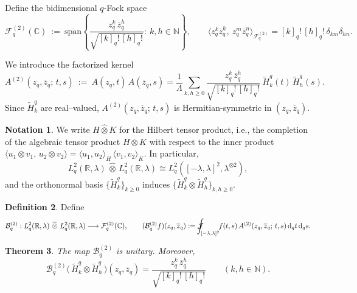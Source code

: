 \documentclass[10pt]{amsart}
\theoremstyle{plain}
\newtheorem{theorem}{Theorem}[section]
\theoremstyle{definition}
\newtheorem{definition}[theorem]{Definition}
\newtheorem{notation}[theorem]{Notation}
\renewcommand{\bar}[1]{\overline{#1}}
\newcommand{\Jint}{\mathcal{J}\mspace{-20mu}\int  }
\def\ge{\geqslant}
\begin{document}
\medskip


Define the {bidimensional $q$-Fock space}
\[
\mathcal{F}^{(2)}_q(\mathbb{C})\ :=\ \overline{\mathrm{span}}\left\{\frac{z_q^k\,\bar z_q^h}{\sqrt{[k]_q!\,[h]_q!}}:\ k,h\in\mathbb{N}\right\},
\qquad 
\big\langle z_q^k\bar z_q^h,\ z_q^m\bar z_q^n\big\rangle_{\mathcal{F}^{(2)}_q}
=[k]_q!\,[h]_q!\,\delta_{km}\delta_{hn}.
\]



We introduce the factorized kernel
\begin{equation}\label{eq:tensor-kernel}
A^{(2)}(z_q,\bar z_q;\,t,s)\ :=\ A(z_q,t)\,A(\bar z_q,s)
=\frac{1}{\Lambda}\sum_{k,h\ge0}\frac{z_q^k\,\bar z_q^h}{\sqrt{[k]_q!\,[h]_q!}}\ \widetilde H^q_k(t)\,\widetilde H^q_h(s).
\end{equation}
Since $\widetilde H^q_k$ are real–valued, $A^{(2)}(z_q,\bar z_q;\,t,s)$ is Hermitian-symmetric in $(z_q,\bar z_q)$.

\begin{notation}
We write $H\widehat\otimes K$ for the {Hilbert tensor product}, i.e., the completion of
the algebraic tensor product $H\otimes K$ with respect to the inner product
$\langle u_1\!\otimes\! v_1,\,u_2\!\otimes\! v_2\rangle=\langle u_1,u_2\rangle_H\,\langle v_1,v_2\rangle_K$.
In particular,
\[
L^2_q(\mathbb{R},\lambda)\,\widehat\otimes\,L^2_q(\mathbb{R},\lambda)
\cong L^2_q([-\lambda,\lambda]^2,\lambda^{\otimes 2}),
\]
and the orthonormal basis $\{\widetilde H^q_k\}_{k\ge0}$ induces
$\{\widetilde H^q_k\otimes \widetilde H^q_h\}_{k,h\ge0}$.
\end{notation}
\begin{definition}
Define
\[
\mathcal{B}_q^{(2)}:L^2_q(\mathbb{R},\lambda)\ \widehat\otimes\ L^2_q(\mathbb{R},\lambda)\longrightarrow \mathcal{F}^{(2)}_q(\mathbb{C}),
\qquad 
(\mathcal{B}_q^{(2)}f)(z_q,\bar z_q):=\Jint_{[-\lambda,\lambda]^2}\!\! f(t,s)\,A^{(2)}(z_q,\bar z_q;\,t,s)\,\mathrm{d}_qt\,\mathrm{d}_qs.
\]
\end{definition}

\begin{theorem}%
The map $\mathcal{B}_q^{(2)}$ is unitary. Moreover,
\[
\mathcal{B}_q^{(2)}\!\big(\,\widetilde H^q_k\otimes \widetilde H^q_h\,\big)(z_q,\bar z_q)
=\frac{z_q^k\,\bar z_q^h}{\sqrt{[k]_q!\,[h]_q!}}\qquad (k,h\in\mathbb{N}).
\]
\end{theorem}
\end{document}
